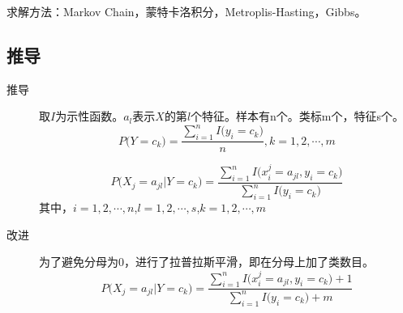 \documentclass{ctexart}
\begin{document}
求解方法：Markov Chain，蒙特卡洛积分，Metroplis-Hasting，Gibbs。



\subsection{推导}
\label{derivations}
\begin{description}
\item[推导]
取$I$为示性函数。$a_l$表示$X$的第$l$个特征。样本有n个。类标m个，特征s个。
\begin{equation}
P\big(Y=c_k\big)=\frac{\sum\limits_{i=1}^{n}I\big(y_i=c_k\big)}{n},k=1,2,\cdots,m
\end{equation}

\begin{equation}
P\big(X_j=a_{jl}|Y=c_k\big)=\frac{\sum\limits_{i=1}^{n}I\big(x_i^j=a_{jl},y_i=c_k\big)}{\sum\limits_{i=1}^{n}I\big(y_i=c_k\big)}
\end{equation}
其中，$i=1,2,\cdots,n$,$l=1,2,\cdots,s$,$k=1,2,\cdots,m$

\item[改进]
为了避免分母为0，进行了拉普拉斯平滑，即在分母上加了类数目。
\begin{equation}
P\big(X_j=a_{jl}|Y=c_k\big)=\frac{\sum\limits_{i=1}^{n}I\big(x_i^j=a_{jl},y_i=c_k\big)+1}{\sum\limits_{i=1}^{n}I\big(y_i=c_k\big)+m}
\end{equation}
\end{description}



\end{document}
